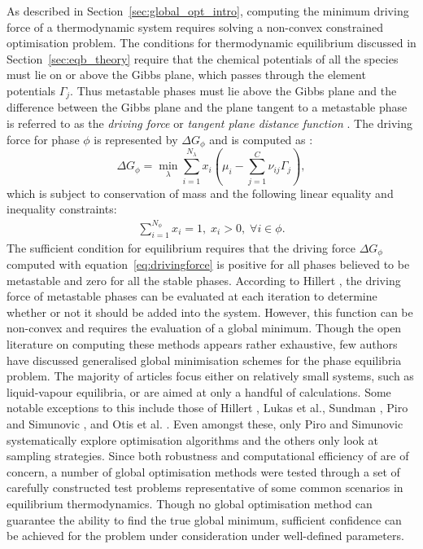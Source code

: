 	As described in Section~\ref{sec:global_opt_intro}, computing the minimum driving force of a thermodynamic system requires solving a non-convex constrained optimisation problem. The conditions for thermodynamic equilibrium discussed in Section~\ref{sec:eqb_theory} require that the chemical potentials of all the species must lie on or above the Gibbs plane, which passes through the element potentials $\Gamma_j$. Thus metastable phases must lie above the Gibbs plane and the difference between the Gibbs plane and the plane tangent to a metastable phase is referred to as the \emph{driving force} \cite{Lukas07} or \emph{tangent plane distance function} \cite{Lukas07,Zhang11}. The driving force for phase $\phi$ is represented by $\Delta G_{\phi}$ and is computed as \cite{Piro16}:
	\begin{equation}\label{eq:drivingforce}
        		\Delta G_{\phi}= \min_{\lambda} \sum_{i=1}^{N_{\lambda}}x_{i} \left (\mu_{i} - \sum_{j=1}^C \nu_{ij}\Gamma_j \right ),
    	\end{equation}
	which is subject to conservation of mass and the following linear equality and inequality constraints:
	\begin{align}
		\sum_{i=1}^{N_\phi} x_i = 1, \; x_i > 0, \; \forall i \in \phi.
	\end{align}
	The sufficient condition for equilibrium requires that the driving force $\Delta G_{\phi}$ computed with equation~\eqref{eq:drivingforce} is positive for all phases believed to be metastable and zero for all the stable phases. According to Hillert \cite{Hillert81}, the driving force of metastable phases can be evaluated at each iteration to determine whether or not it should be added into the system. However, this function can be non-convex and requires the evaluation of a global minimum. Though the open literature on computing these methods appears rather exhaustive, few authors have discussed generalised global minimisation schemes for the phase equilibria problem. The majority of articles focus either on relatively small systems, such as liquid-vapour equilibria, or are aimed at only a handful of calculations. Some notable exceptions to this include those of Hillert \cite{Hillert81}, Lukas et al.\cite{LUKAS1982229}, Sundman \cite{Sundman15}, Piro and Simunovic \cite{Piro16}, and Otis et al. \cite{Otis:2017ab}. Even amongst these, only Piro and Simunovic \cite{Piro16} systematically explore optimisation algorithms and the others only look at sampling strategies. Since both robustness and computational efficiency of {\GEM} are of concern, a number of global optimisation methods were tested through a set of carefully constructed test problems representative of some common scenarios in equilibrium thermodynamics. Though no global optimisation method can guarantee the ability to find the true global minimum, sufficient confidence can be achieved for the problem under consideration under well-defined parameters.
	
